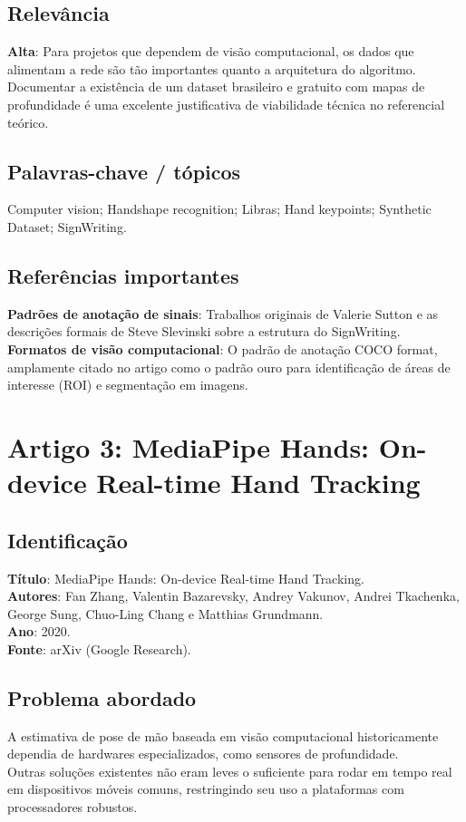 \documentclass[12pt, a4paper]{article}
\begin{document}
\subsection{Relevância}
\textbf{Alta}: Para projetos que dependem de visão computacional, os dados que alimentam a rede são tão importantes quanto a arquitetura do algoritmo. Documentar a existência de um dataset brasileiro e gratuito com mapas de profundidade é uma excelente justificativa de viabilidade técnica no referencial teórico.\\
\subsection{Palavras-chave / tópicos}
Computer vision; Handshape recognition; Libras; Hand keypoints; Synthetic Dataset; SignWriting.\\
\subsection{Referências importantes}
\textbf{Padrões de anotação de sinais}: Trabalhos originais de Valerie Sutton e as descrições formais de Steve Slevinski sobre a estrutura do SignWriting.\\
\textbf{Formatos de visão computacional}: O padrão de anotação COCO format, amplamente citado no artigo como o padrão ouro para identificação de áreas de interesse (ROI) e segmentação em imagens.\\
\newpage
\section{Artigo 3: MediaPipe Hands: On-device Real-time Hand Tracking}
\subsection{Identificação}
\textbf{Título}: MediaPipe Hands: On-device Real-time Hand Tracking.\\
\textbf{Autores}: Fan Zhang, Valentin Bazarevsky, Andrey Vakunov, Andrei Tkachenka, George Sung, Chuo-Ling Chang e Matthias Grundmann.\\
\textbf{Ano}: 2020.\\
\textbf{Fonte}: arXiv (Google Research).\\
\subsection{Problema abordado}
A estimativa de pose de mão baseada em visão computacional historicamente dependia de hardwares especializados, como sensores de profundidade.\\
Outras soluções existentes não eram leves o suficiente para rodar em tempo real em dispositivos móveis comuns, restringindo seu uso a plataformas com processadores robustos.\\
\end{document}
